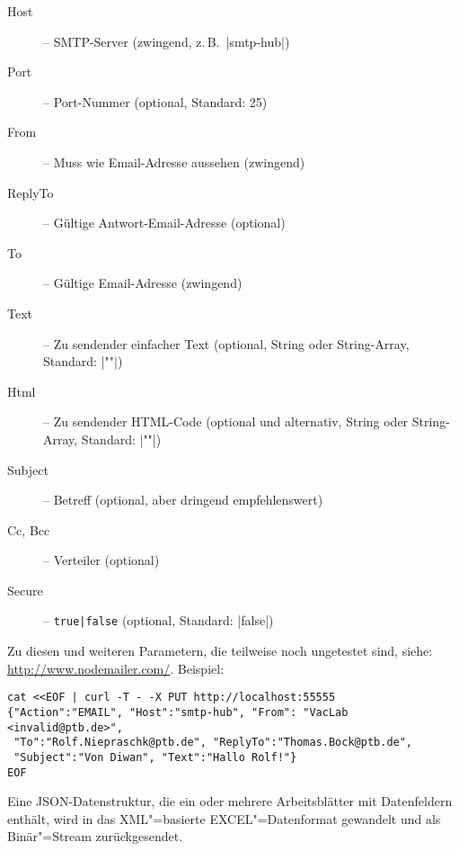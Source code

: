\documentclass[titlepage=false,toc=nobibliography]{vl-report}
\newcommand*\action[1]{\fbox{\nolinkurl{#1}}\medskip\par}
\begin{document}
\begin{description}
\begin{description}
    \item \action{EMAIL}

      \begin{description}

        \item[Host] -- SMTP-Server (zwingend, z.\,B.\ |smtp-hub|)

        \item[Port] -- Port-Nummer (optional, Standard: 25)

        \item[From] -- Muss wie Email-Adresse aussehen (zwingend)
        
        \item[ReplyTo] -- Gültige Antwort-Email-Adresse (optional)

        \item[To] -- Gültige Email-Adresse (zwingend)

        \item[Text] -- Zu sendender einfacher Text (optional, 
          String oder String-Array, Standard: |""|)
        
        \item[Html] -- Zu sendender HTML-Code (optional und alternativ, 
          String oder String-Array, Standard: |""|)
        
        \item[Subject] -- Betreff (optional, aber dringend empfehlenswert)

        \item[Cc, Bcc] -- Verteiler (optional)
        
        \item[Secure] -- \verb+true|false+ (optional, Standard: |false|)

      \end{description}

      \noindent Zu diesen und weiteren Parametern, die teilweise noch ungetestet 
      sind, siehe: \url{http://www.nodemailer.com/}. Beispiel:
\begin{lstlisting}[language={}]
cat <<EOF | curl -T - -X PUT http://localhost:55555
{"Action":"EMAIL", "Host":"smtp-hub", "From": "VacLab <invalid@ptb.de>", 
 "To":"Rolf.Niepraschk@ptb.de", "ReplyTo":"Thomas.Bock@ptb.de",
 "Subject":"Von Diwan", "Text":"Hallo Rolf!"}
EOF
\end{lstlisting}

    \item \action{XLSX-OUT}

      \noindent Eine JSON-Datenstruktur, die ein oder mehrere Arbeitsblätter
      mit Datenfeldern enthält, wird in das XML"=basierte EXCEL"=Datenformat
      gewandelt und als Binär"=Stream zurückgesendet.


\end{description}
\end{description}
\end{document}
